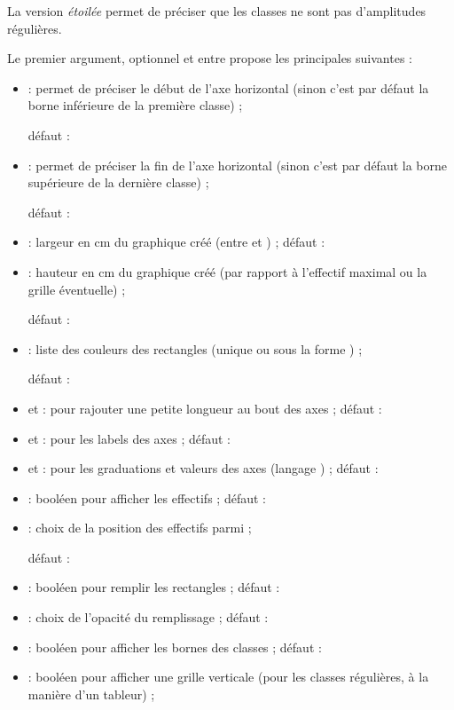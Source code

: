 \begin{cautionblock}
La version \textit{étoilée} permet de préciser que les classes ne sont pas d'amplitudes régulières.

\medskip

Le premier argument, optionnel et entre \ctex{[...]} propose les  principales suivantes :

\begin{itemize}
	\item {} : permet de préciser le début de l'axe horizontal (sinon c'est par défaut la borne inférieure de la première classe) ;
	
	\hfill{}défaut : 
	\item {} : permet de préciser la fin de l'axe horizontal (sinon c'est par défaut la borne supérieure de la dernière classe) ;
	
	\hfill{}défaut : 
	\item {} : largeur en cm du graphique créé (entre  et ) ; \hfill{}défaut : 
	\item {} : hauteur en cm du graphique créé (par rapport à l'effectif maximal ou la grille éventuelle) ;
	
	\hfill{}défaut : 
	\item {} : liste des couleurs des rectangles (unique ou sous la forme ) ;
	
	\hfill{}défaut : 
	\item {} et  : pour rajouter une petite longueur au bout des axes ; \hfill{}défaut : \Cle{5mm}
	\item {} et  : pour les labels des axes ; \hfill{}défaut : 
	\item {} et  : pour les graduations et valeurs des axes (langage ) ; \hfill{}défaut : 
	\item {} : booléen pour afficher les effectifs ; \hfill{}défaut : 
	\item {} : choix de la position des effectifs parmi  ;
	
	\hfill{}défaut : 
	\item {} : booléen pour remplir les rectangles ; \hfill{}défaut : 
	\item {} : choix de l'opacité du remplissage ; \hfill{}défaut : 
	\item {} : booléen pour afficher les bornes des classes ; \hfill{}défaut : 
	\item {} : booléen pour afficher une grille verticale (pour les classes régulières, à la manière d'un tableur) ;
	

\end{itemize}
\end{cautionblock}
